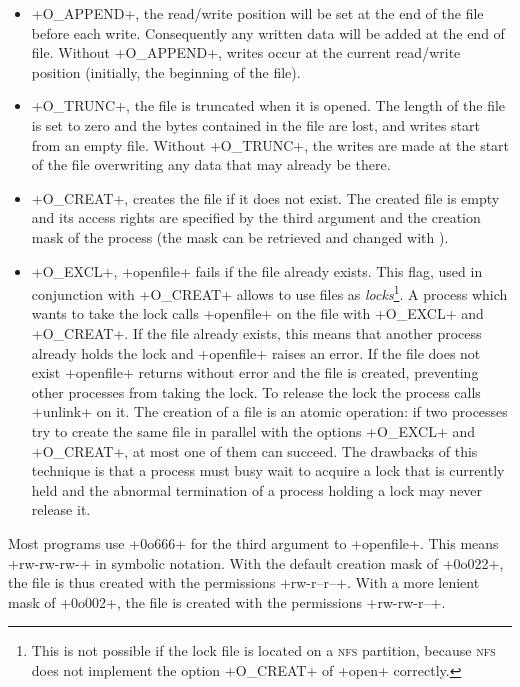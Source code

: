 \begin{itemize}
\item \ml+O_APPEND+, the read/write position will be set at the end of
  the file before each write. Consequently any written data will be
  added at the end of file. Without \ml+O_APPEND+, writes occur at the
  current read/write position (initially, the beginning of the file).

\item \ml+O_TRUNC+, the file is truncated when it
is opened. The length of the file is set to zero and the bytes
contained in the file are lost, and writes start from an empty file. 
Without \ml+O_TRUNC+, the writes are made at the start of the file
overwriting any data that may already be there.

\item \ml+O_CREAT+, creates the file if it does not exist. The created
  file is empty and its access rights are specified by the third argument 
  and the creation mask of the process (the mask can be retrieved 
  and changed with ).

\item \ml+O_EXCL+, \ml+openfile+ fails if the file already exists.
  This flag, used in conjunction with \ml+O_CREAT+ allows to use
  files as \label{page/lock}\emph{locks}\footnote{This is not 
    possible if the lock file
    is located on a \textsc{nfs} partition, because \textsc{nfs} does
    not implement the option \ml+O_CREAT+ of \ml+open+ correctly.}. A process
  which wants to take the lock calls \ml+openfile+ on the file with
  \ml+O_EXCL+ and \ml+O_CREAT+. If the file already exists, this means
  that another process already holds the lock and \ml+openfile+ raises
  an error. If the file does not exist \ml+openfile+ returns without
  error and the file is created, preventing other processes from
  taking the lock. To release the lock the process calls
  \ml+unlink+ on it. The creation of a file is an atomic operation: if
  two processes try to create the same file in parallel with the
  options \ml+O_EXCL+ and \ml+O_CREAT+, at most one of them can
  succeed. The drawbacks of this technique is that a process must
  busy wait to acquire a lock that is currently held and
  the abnormal termination of a process holding a lock may never
  release it.
\end{itemize}
\begin{example} 
Most programs use \ml+0o666+ for the third argument
to \ml+openfile+. This means \ml+rw-rw-rw-+ in symbolic notation. 
With the default creation mask of \ml+0o022+, the
file is thus created with the permissions \ml+rw-r--r--+. With a more 
lenient mask of \ml+0o002+, the file is created with the permissions 
\ml+rw-rw-r--+.
\enlargethispage{1\baselineskip} %
\enlargethispage{2\medskipamount} %
\end{example}

